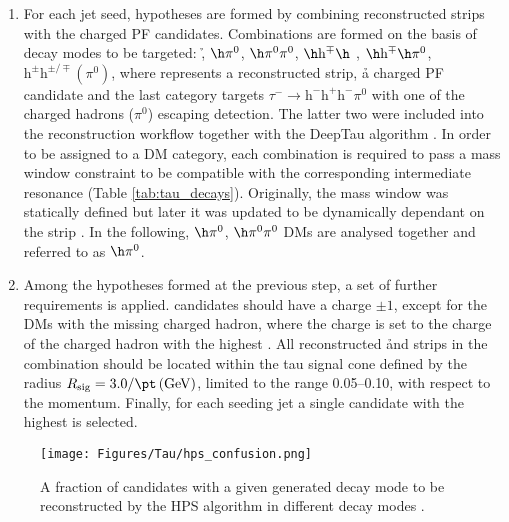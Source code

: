 \begin{enumerate}
    \item For each jet seed, \tauh hypotheses are formed by combining reconstructed strips with the charged PF candidates. Combinations are formed on the basis of decay modes to be targeted: \h, $\h \pi^0$, $\h \pi^0 \pi^0$, $\h \text{h}^\mp \h$ , $\h \text{h}^\mp \h \pi^0$, $\text{h}^\pm\text{h}^{\pm/\mp} (\pi^0)$, where \piz represents a reconstructed strip, \h a charged PF candidate and the last category targets $\tau^- \to \text{h}^- \text{h}^+ \text{h}^- \pi^0$ with one of the charged hadrons ($\pi^0$) escaping detection. The latter two were included into the reconstruction workflow together with the DeepTau algorithm \cite{CMS:2022prd}. In order to be assigned to a DM category, each combination is required to pass a mass window constraint to be compatible with the corresponding intermediate resonance (Table \ref{tab:tau_decays}). Originally, the mass window was statically defined but later it was updated to be dynamically dependant on the strip \pt. In the following, $\h \pi^0$, $\h \pi^0 \pi^0$ DMs are analysed together and referred to as $\h \pi^0$. 
    \item Among the \tauh hypotheses formed at the previous step, a set of further requirements is applied. \tauh candidates should  have a charge $\pm 1$, except for the DMs with the missing charged hadron, where the \tauh charge is set to the charge of the charged hadron with the highest \pt. All reconstructed \h and strips in the combination should be located within the tau signal cone defined by the radius $R_\text{sig} = 3.0 / \pt \, \text{(GeV)}$, limited to the range 0.05–0.10, with respect to the \tauh momentum. Finally, for each seeding jet a single \tauh candidate with the highest \pt is selected.
    \end{enumerate}

\begin{figure}[t!]
    \centering
    \texttt{[image: Figures/Tau/hps\_confusion.png]}
    \caption{A fraction of \tauh candidates with a given generated decay mode to be reconstructed by the HPS algorithm in different decay modes \cite{CMS:2022prd}.}
    \label{fig:hps_confusion_matrix}
\end{figure}

